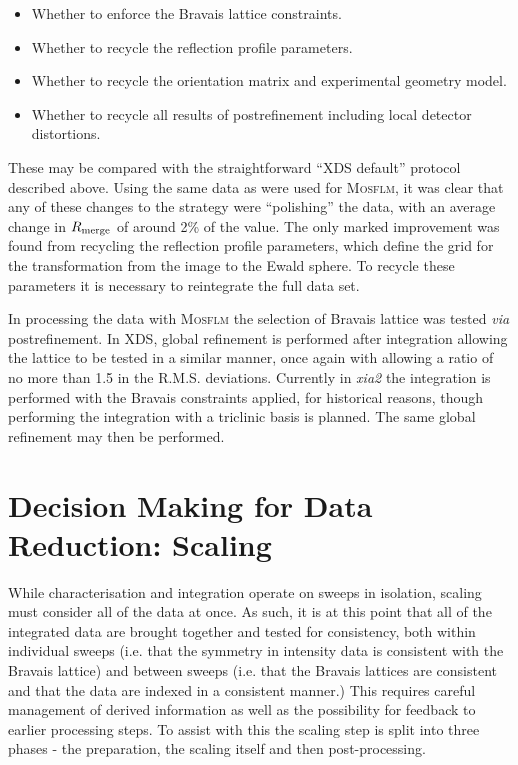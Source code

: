 \documentclass[preprint,pdf]{iucr}
\begin{document}
\begin{itemize}
\item{Whether to enforce the Bravais lattice constraints.}
\item{Whether to recycle the reflection profile parameters.}
\item{Whether to recycle the orientation matrix and experimental
    geometry model.}
\item{Whether to recycle all results of postrefinement including local
    detector distortions.}
\end{itemize}

\noindent
These may be compared with the straightforward ``XDS default''
protocol described above. Using
the same data as were used for \textsc{Mosflm}, it was
clear that any of these changes to the strategy were ``polishing'' the
data, with an average change in $R_{\rm{merge}}$ of around 2\% of the
value. The only marked improvement was found from recycling the
reflection profile parameters, which define the grid for the
transformation from the image to the Ewald sphere.
To recycle these parameters it is necessary to reintegrate the full data set.

In processing the data with \textsc{Mosflm} the selection of Bravais lattice
was tested \emph{via} postrefinement. In XDS, global refinement is
performed after integration allowing the lattice to be tested in a
similar manner, once again with allowing a ratio of no more than 1.5
in the R.M.S. deviations. Currently in
\emph{xia2} the integration is performed with the Bravais constraints
applied, for historical reasons, though performing the integration
with a triclinic basis is planned. The same global refinement may then
be performed.

\section{Decision Making for Data Reduction: Scaling}

While characterisation and integration operate on sweeps in isolation,
scaling must consider all of the data at once. As such, it is at this
point that all of the integrated data are brought together and tested
for consistency, both within individual sweeps (i.e. that the symmetry
in intensity data is consistent with the Bravais lattice) and between
sweeps (i.e. that the Bravais lattices are consistent and that the
data are indexed in a consistent manner.) This requires careful
management of derived information as well as the possibility for feedback to
earlier processing steps. To assist with this the scaling step is
split into three phases - the preparation, the scaling itself and then
post-processing.
\end{document}
